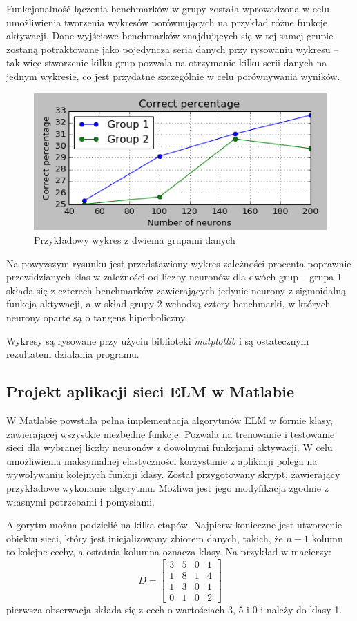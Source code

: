 \documentclass{article}
\begin{document}
Funkcjonalność łączenia benchmarków w grupy została wprowadzona w celu umożliwienia tworzenia wykresów porównujących na przykład różne funkcje aktywacji. Dane wyjściowe benchmarków znajdujących się w tej samej grupie zostaną potraktowane jako pojedyncza seria danych przy rysowaniu wykresu -- tak więc stworzenie kilku grup pozwala na otrzymanie kilku serii danych na jednym wykresie, co jest przydatne szczególnie w celu porównywania wyników.  
\begin{figure}[H]
\includegraphics[width=\textwidth]{przykladowy_wykres.png}
\caption{Przykładowy wykres z dwiema grupami danych}
\end{figure}
Na powyższym rysunku jest przedstawiony wykres zależności procenta poprawnie przewidzianych klas w zależności od liczby neuronów dla dwóch grup -- grupa 1 składa się z czterech benchmarków zawierających jedynie neurony z sigmoidalną funkcją aktywacji, a w skład grupy 2 wchodzą cztery benchmarki, w których neurony oparte są o tangens hiperboliczny. 

Wykresy są rysowane przy użyciu biblioteki \textit{matplotlib} i są ostatecznym rezultatem działania programu.

\subsection{Projekt aplikacji sieci ELM w Matlabie}
W Matlabie powstała pełna implementacja algorytmów ELM w formie klasy, zawierającej wszystkie niezbędne funkcje.
Pozwala na trenowanie i testowanie sieci dla wybranej liczby neuronów z dowolnymi funkcjami aktywacji. 
W celu umożliwienia maksymalnej elastyczności korzystanie z aplikacji polega na wywoływaniu kolejnych funkcji klasy.
Został przygotowany skrypt, zawierający przykładowe wykonanie algorytmu.
Możliwa jest jego modyfikacja zgodnie z własnymi potrzebami i pomysłami.

Algorytm można podzielić na kilka etapów.
Najpierw konieczne jest utworzenie obiektu sieci, który jest inicjalizowany zbiorem danych, takich, że $n-1$ kolumn to kolejne cechy, a ostatnia kolumna oznacza klasy.
Na przykład w macierzy:
\[D= \begin{bmatrix} 3&5&0&1 \\ 1&8&1&4 \\ 1&3&0&1 \\ 0&1&0&2 \end{bmatrix}\]
pierwsza obserwacja składa się z cech o wartościach 3, 5 i 0 i należy do klasy 1.
\end{document}
